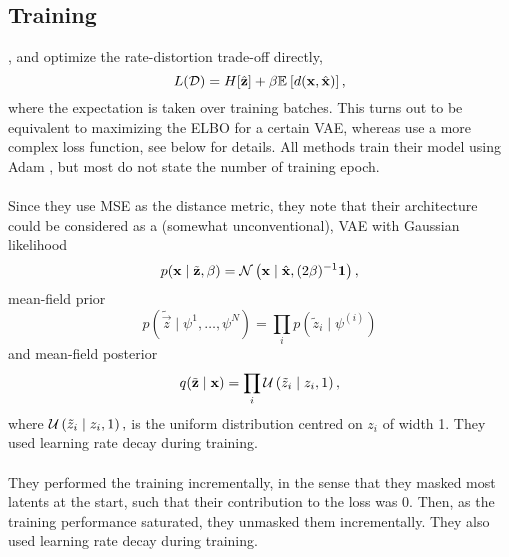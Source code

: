 \subsection{Training}
\par
\cite{balle2016end}, \cite{theis2017lossy} and \cite{balle2018variational}
optimize the rate-distortion trade-off directly,
\[
  L(\mathcal{D}) = H[\hat{\mathbf{z}}] + \beta \mathbb{E}_{}\left[ d(\mathbf{x}, \hat{\mathbf{x}}) \right],
\]
where the expectation is taken over training batches. This turns out to be
equivalent to maximizing the ELBO for a certain VAE, whereas \cite{rippel2017real} use a
more complex loss function, see below for details. All methods train their model
using Adam \cite{kingma2014adam}, but most do not state the number of
training epoch.

\paragraph{\cite{balle2016end}} Since they use MSE as the distance metric,
they note that their
architecture could be considered as a (somewhat
unconventional), VAE with Gaussian likelihood
\[
  p(\mathbf{x} \mid \tilde{\mathbf{z}}, \beta) =
  \mathcal{N}\left( \mathbf{x} \mid \hat{\mathbf{x}}, (2\beta)^{-1}\mathbf{1} \right),
\]
mean-field prior
\[
  p(\tilde{\vec{z}} \mid \psi^{1}, \hdots, \psi^{N}) =
  \prod_i p(\tilde{z}_i \mid \psi^{(i)})
\]
and mean-field posterior
\[
  q(\tilde{\mathbf{z}} \mid \mathbf{x}) =
  \prod_i \mathcal{U}\left( \tilde{z}_i \mid z_i, 1 \right),
\]
where $\mathcal{U}\left( \tilde{z}_i \mid z_i, 1 \right),$ is the uniform distribution centred
on $z_i$ of width 1. They used learning rate decay during training.

\paragraph{\cite{theis2017lossy}}
  They performed the training incrementally, in the sense that they masked most
  latents at the start, such that their contribution to the loss was 0. Then, as
  the training performance saturated, they unmasked them incrementally. They
  also used learning rate decay during training.

